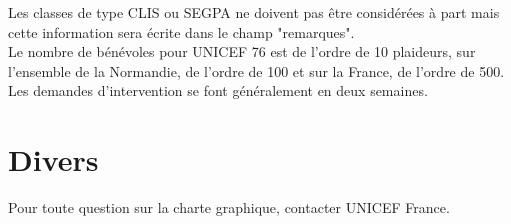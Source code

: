 \documentclass [a4paper] {article}
\begin{document}
Les classes de type CLIS ou SEGPA ne doivent pas être considérées à part mais cette information sera écrite dans le champ "remarques".
\\

Le nombre de bénévoles pour UNICEF 76 est de l'ordre de 10 plaideurs, sur l'ensemble de la Normandie, de l'ordre de 100 et sur la France, de l'ordre de 500.
\\

Les demandes d'intervention se font généralement en deux semaines.
\\

\section{Divers}

Pour toute question sur la charte graphique, contacter UNICEF France.







\newpage
\end{document}
